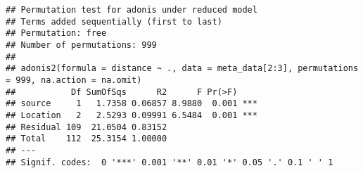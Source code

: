 \documentclass[
]{article}
\newenvironment{Shaded}{\begin{snugshade}}{\end{snugshade}}
\newcommand{\AttributeTok}[1]{\textcolor[rgb]{0.77,0.63,0.00}{#1}}
\newcommand{\CommentTok}[1]{\textcolor[rgb]{0.56,0.35,0.01}{\textit{#1}}}
\newcommand{\ConstantTok}[1]{\textcolor[rgb]{0.00,0.00,0.00}{#1}}
\newcommand{\DecValTok}[1]{\textcolor[rgb]{0.00,0.00,0.81}{#1}}
\newcommand{\FloatTok}[1]{\textcolor[rgb]{0.00,0.00,0.81}{#1}}
\newcommand{\FunctionTok}[1]{\textcolor[rgb]{0.00,0.00,0.00}{#1}}
\newcommand{\NormalTok}[1]{#1}
\newcommand{\OtherTok}[1]{\textcolor[rgb]{0.56,0.35,0.01}{#1}}
\newcommand{\SpecialCharTok}[1]{\textcolor[rgb]{0.00,0.00,0.00}{#1}}
\begin{document}
\begin{verbatim}
## Permutation test for adonis under reduced model
## Terms added sequentially (first to last)
## Permutation: free
## Number of permutations: 999
## 
## adonis2(formula = distance ~ ., data = meta_data[2:3], permutations = 999, na.action = na.omit)
##           Df SumOfSqs      R2      F Pr(>F)    
## source     1   1.7358 0.06857 8.9880  0.001 ***
## Location   2   2.5293 0.09991 6.5484  0.001 ***
## Residual 109  21.0504 0.83152                  
## Total    112  25.3154 1.00000                  
## ---
## Signif. codes:  0 '***' 0.001 '**' 0.01 '*' 0.05 '.' 0.1 ' ' 1
\end{verbatim}

\begin{Shaded}
\end{Shaded}
\end{document}
